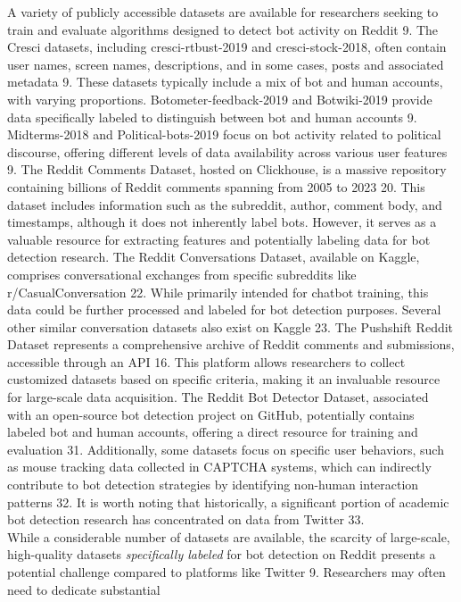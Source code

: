 \documentclass[
  12pt,
  letterpaper,
  DIV=11,
  numbers=noendperiod]{scrartcl}
\begin{document}
A variety of publicly accessible datasets are available for researchers
seeking to train and evaluate algorithms designed to detect bot activity
on Reddit 9. The Cresci datasets, including cresci-rtbust-2019 and
cresci-stock-2018, often contain user names, screen names, descriptions,
and in some cases, posts and associated metadata 9. These datasets
typically include a mix of bot and human accounts, with varying
proportions. Botometer-feedback-2019 and Botwiki-2019 provide data
specifically labeled to distinguish between bot and human accounts 9.
Midterms-2018 and Political-bots-2019 focus on bot activity related to
political discourse, offering different levels of data availability
across various user features 9. The Reddit Comments Dataset, hosted on
Clickhouse, is a massive repository containing billions of Reddit
comments spanning from 2005 to 2023 20. This dataset includes
information such as the subreddit, author, comment body, and timestamps,
although it does not inherently label bots. However, it serves as a
valuable resource for extracting features and potentially labeling data
for bot detection research. The Reddit Conversations Dataset, available
on Kaggle, comprises conversational exchanges from specific subreddits
like r/CasualConversation 22. While primarily intended for chatbot
training, this data could be further processed and labeled for bot
detection purposes. Several other similar conversation datasets also
exist on Kaggle 23. The Pushshift Reddit Dataset represents a
comprehensive archive of Reddit comments and submissions, accessible
through an API 16. This platform allows researchers to collect
customized datasets based on specific criteria, making it an invaluable
resource for large-scale data acquisition. The Reddit Bot Detector
Dataset, associated with an open-source bot detection project on GitHub,
potentially contains labeled bot and human accounts, offering a direct
resource for training and evaluation 31. Additionally, some datasets
focus on specific user behaviors, such as mouse tracking data collected
in CAPTCHA systems, which can indirectly contribute to bot detection
strategies by identifying non-human interaction patterns 32. It is worth
noting that historically, a significant portion of academic bot
detection research has concentrated on data from Twitter 33.\\
While a considerable number of datasets are available, the scarcity of
large-scale, high-quality datasets \emph{specifically labeled} for bot
detection on Reddit presents a potential challenge compared to platforms
like Twitter 9. Researchers may often need to dedicate substantial
\end{document}
